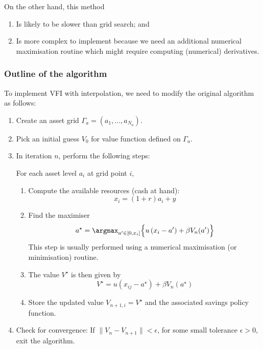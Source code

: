 \documentclass{scrartcl}
\providecommand{\tightlist}{%
      \setlength{\itemsep}{0pt}\setlength{\parskip}{0pt}}
\begin{document}
On the other hand, this method

\begin{enumerate}
\def\labelenumi{\arabic{enumi}.}
\tightlist
\item
  Is likely to be slower than grid search; and
\item
  Is more complex to implement because we need an additional numerical
  maximisation routine which might require computing (numerical)
  derivatives.
\end{enumerate}

    \hypertarget{outline-of-the-algorithm}{%
\subsubsection*{Outline of the algorithm}\label{outline-of-the-algorithm}}

To implement VFI with interpolation, we need to modify the original
algorithm as follows:

\begin{enumerate}
\def\labelenumi{\arabic{enumi}.}
\item
  Create an asset grid \(\Gamma_a = (a_1, \dots, a_{N_a})\).
\item
  Pick an initial guess \(V_0\) for value function defined on
  \(\Gamma_a\).
\item
  In iteration \(n\), perform the following steps:

  For each asset level \(a_i\) at grid point \(i\),

  \begin{enumerate}
  \def\labelenumii{\arabic{enumii}.}
  \tightlist
  \item
    Compute the available resources (cash at hand):
    \[x_{i} = (1+r)a_i + y\]
  \item
    Find the maximiser
    \[a^{\star} = \argmax_{a' \in [0, x_{i}]} \Bigl\{ u\left(x_{i}-a'\right) + \beta V_n(a') \Bigr\}\]
    This step is usually performed using a numerical maximisation (or
    minimisation) routine.
  \item
    The value \(V^{\star}\) is then given by
    \[V^{\star} = u\left(x_{ij}-a^{\star}\right) + \beta V_n(a^{\star})\]
  \item
    Store the updated value \(V_{n+1,i} = V^{\star}\) and the associated
    savings policy function.
  \end{enumerate}
\item
  Check for convergence: If \(\|V_n-V_{n+1}\| < \epsilon\), for some
  small tolerance \(\epsilon > 0\), exit the algorithm.
\end{enumerate}
\end{document}
